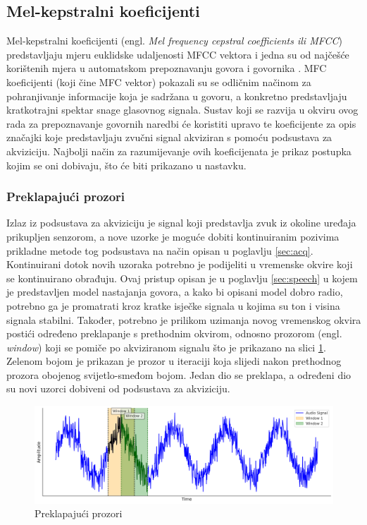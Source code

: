\subsection{Mel-kepstralni koeficijenti}
\label{MFCCconstruction}
Mel-kepstralni koeficijenti (engl. \textit{Mel frequency cepstral coefficients ili MFCC}) predstavljaju mjeru 
euklidske udaljenosti MFCC vektora i jedna su od najčešće korištenih mjera u automatskom 
prepoznavanju govora i govornika \cite{vasilijevic2011perceptual}. 
MFC koeficijenti (koji čine MFC vektor) pokazali su se odličnim načinom za pohranjivanje informacije
koja je sadržana u govoru, a konkretno predstavljaju kratkotrajni spektar snage glasovnog 
signala. Sustav koji se razvija u okviru ovog rada za prepoznavanje govornih naredbi će koristiti upravo te koeficijente za opis
značajki koje predstavljaju zvučni signal akviziran s pomoću podsustava za akviziciju. 
Najbolji način za razumijevanje ovih koeficijenata je prikaz postupka kojim se oni dobivaju, što će biti prikazano u nastavku.


\subsubsection{Preklapajući prozori}
\label{sec:win}
Izlaz iz podsustava za akviziciju je signal koji predstavlja zvuk iz okoline uređaja prikupljen senzorom, 
a nove uzorke je moguće dobiti kontinuiranim pozivima prikladne metode tog podsustava
na način opisan u poglavlju \ref{sec:acq}. Kontinuirani dotok novih uzoraka potrebno 
je podijeliti u vremenske okvire koji se kontinuirano obrađuju. 
Ovaj pristup opisan je u poglavlju \ref{sec:speech} u kojem je predstavljen
model nastajanja govora, a kako bi opisani model dobro radio, potrebno ga je promatrati
kroz kratke isječke signala u kojima su ton i visina signala stabilni. Također, potrebno je prilikom uzimanja novog vremenskog okvira postići određeno preklapanje s prethodnim okvirom, odnosno prozorom (engl. \textit{window})
koji se pomiče po akviziranom signalu što je prikazano na slici \ref{pic:sliding}. Zelenom bojom je prikazan je prozor
u iteraciji koja slijedi nakon prethodnog prozora obojenog svijetlo-smeđom bojom. Jedan dio se preklapa,
a određeni dio su novi uzorci dobiveni od podsustava za akviziciju.

\begin{figure}[htb]
    \centering
    \includegraphics[width=0.9\linewidth]{Chapters/struktura_sustava/generiranje_znacajki/sliding.png} 
    \caption{Preklapajući prozori}
    \label{pic:sliding}
\end{figure}

